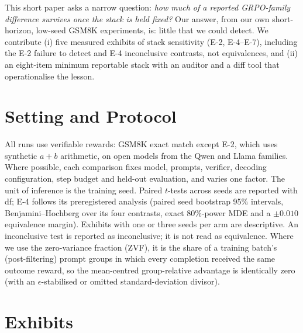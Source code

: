 This short paper asks a narrow question: \emph{how much of a reported GRPO-family
difference survives once the stack is held fixed?} Our answer, from our own
short-horizon, low-seed GSM8K experiments, is: little that we could detect.
We contribute (i) five measured exhibits
of stack sensitivity (E-2, E-4--E-7), including the E-2 failure to detect and
E-4 inconclusive contrasts, not equivalences, and (ii) an eight-item minimum reportable stack with an
auditor and a diff tool that operationalise the lesson.

\section{Setting and Protocol}

All runs use verifiable rewards: GSM8K exact match
\citep{cobbe2021training} except E-2, which uses synthetic $a{+}b$
arithmetic, on open models from the Qwen \citep{yang2024qwen25,yang2025qwen3} and Llama \citep{grattafiori2024llama3} families.
Where possible, each comparison fixes model, prompts, verifier, decoding
configuration, step budget and held-out evaluation, and varies one factor.
The unit of inference is the training seed. Paired $t$-tests across seeds
are reported with df; E-4 follows its preregistered analysis (paired seed
bootstrap 95\% intervals, Benjamini--Hochberg \citep{benjamini1995controlling} over its four contrasts, exact
80\%-power MDE and a $\pm0.010$ equivalence margin). Exhibits with one or
three seeds per arm are descriptive. An inconclusive test is reported as
inconclusive; it is not read as equivalence. Where we use the
zero-variance fraction (ZVF), it is the share of a training batch's
(post-filtering) prompt groups in which every completion received the same
outcome reward, so the mean-centred group-relative advantage is identically
zero (with an $\epsilon$-stabilised or omitted standard-deviation divisor).

\section{Exhibits}

